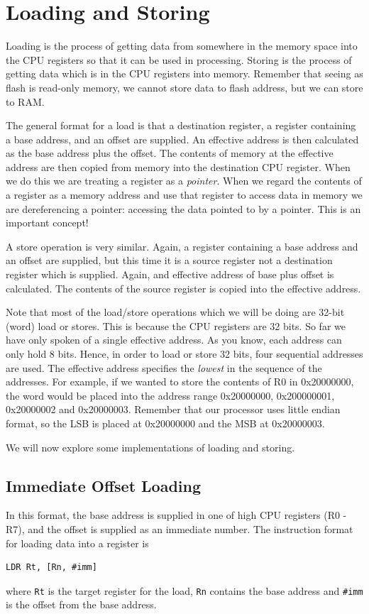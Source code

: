 \chapter{Loading and Storing}

Loading is the process of getting data from somewhere in the memory space into the CPU registers so that it can be used in processing. Storing is the process of getting data which is in the CPU registers into memory. Remember that seeing as flash is read-only memory, we cannot store data to flash address, but we can store to RAM.

The general format for a load is that a destination register, a register containing a base address, and an offset are supplied. An effective address is then calculated as the base address plus the offset. The contents of memory at the effective address are then copied from memory into the destination CPU register. When we do this we are treating a register as a \emph{pointer}. When we regard the contents of a register as a memory address and use that register to access data in memory we are dereferencing a pointer: accessing the data pointed to by a pointer. This is an important concept!

A store operation is very similar. Again, a register containing a base address and an offset are supplied, but this time it is a source register not a destination register which is supplied. Again, and effective address of base plus offset is calculated. The contents of the source register is copied into the effective address. 

Note that most of the load/store operations which we will be doing are 32-bit (word) load or stores. This is because the CPU registers are 32 bits. So far we have only spoken of a single effective address. As you know, each address can only hold 8 bits. Hence, in order to load or store 32 bits, four sequential addresses are used. The effective address specifies the \emph{lowest} in the sequence of the addresses. For example, if we wanted to store the contents of R0 in 0x20000000, the word would be placed into the address range 0x20000000, 0x200000001, 0x20000002 and 0x20000003. Remember that our processor uses little endian format, so the LSB is placed at 0x20000000 and the MSB at 0x20000003.

We will now explore some implementations of loading and storing.

\section{Immediate Offset Loading}
In this format, the base address is supplied in one of high CPU registers (R0 - R7), and the offset is supplied as an immediate number. 
The instruction format for loading data into a register is
\begin{lstlisting}[fontadjust=true,frame=trBL]
LDR Rt, [Rn, #imm]
\end{lstlisting}
where \texttt{Rt} is the target register for the load, \texttt{Rn} contains the base address and \texttt{\#imm} is the offset from the base address.

